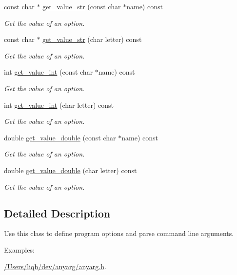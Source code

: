 {\bf }\par
\begin{DoxyCompactItemize}
\item 
const char $\ast$ \hyperlink{class_anyarg_a9788b24659c4b7ab69cfb8b1f55f1c15}{get\+\_\+value\+\_\+str} (const char $\ast$name) const 
\begin{DoxyCompactList}\small\item\em Get the value of an option. \end{DoxyCompactList}\item 
const char $\ast$ \hyperlink{class_anyarg_a8b5d891a9e146c17cd4d8038c5265fcc}{get\+\_\+value\+\_\+str} (char letter) const 
\begin{DoxyCompactList}\small\item\em Get the value of an option. \end{DoxyCompactList}\item 
int \hyperlink{class_anyarg_ae254a7571efbf058ad98fcd00a176470}{get\+\_\+value\+\_\+int} (const char $\ast$name) const 
\begin{DoxyCompactList}\small\item\em Get the value of an option. \end{DoxyCompactList}\item 
int \hyperlink{class_anyarg_a2c45edbcd6de87992c227c3994eb7e72}{get\+\_\+value\+\_\+int} (char letter) const 
\begin{DoxyCompactList}\small\item\em Get the value of an option. \end{DoxyCompactList}\item 
double \hyperlink{class_anyarg_a8d46bd713bb7bc5bd303e23afd5609d1}{get\+\_\+value\+\_\+double} (const char $\ast$name) const 
\begin{DoxyCompactList}\small\item\em Get the value of an option. \end{DoxyCompactList}\item 
double \hyperlink{class_anyarg_ad607e8d76b475ff3c5a9ccb4032258d7}{get\+\_\+value\+\_\+double} (char letter) const 
\begin{DoxyCompactList}\small\item\em Get the value of an option. \end{DoxyCompactList}\end{DoxyCompactItemize}



\subsection{Detailed Description}
Use this class to define program options and parse command line arguments. \begin{Desc}
\item[Examples\+: ]\par
\hyperlink{_2_users_2liqb_2dev_2anyarg_2anyarg_8h-example}{/\+Users/liqb/dev/anyarg/anyarg.\+h}.\end{Desc}


